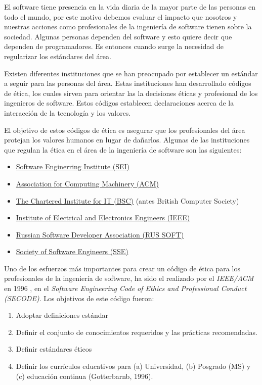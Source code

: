 \documentclass[twoside]{article}
\begin{document}
\begin{multicols}{2}
El software tiene presencia en la vida diaria de la mayor parte de las personas
en todo el mundo, por este motivo debemos evaluar el impacto que nosotros y
nuestras acciones como profesionales de la ingeniería de software tienen sobre
la sociedad. Algunas personas dependen del software y esto quiere decir que
dependen de programadores. Es entonces cuando surge la necesidad de regularizar
los estándares del área.

Existen diferentes instituciones que se han preocupado por establecer un
estándar a seguir para las personas del área. Estas instituciones han
desarrollado códigos de ética, los cuales sirven para orientar las la decisiones
éticas y profesional de los ingenieros de software. Estos códigos establecen
declaraciones acerca de la interacción de la tecnología y los valores.

El objetivo de estos códigos de ética es asegurar que los profesionales del área
protejan los valores humanos en lugar de dañarlos. Algunas de las instituciones
que regulan la ética en el área de la ingeniería de software son las siguientes:

\begin{itemize}
    \item \href{https://www.sei.cmu.edu/}{Software Enginerring Institute (SEI)}
    \item \href{https://www.acm.org/}{Association for Computing Machinery (ACM)}
\item \href{https://www.bcs.org/}{The Chartered Institute for IT (BSC)} (antes
British Computer Society)
\item \href{https://www.ieee.org/}{Institute of Electrical and Electronics
Engineers (IEEE)} \cite{rogerson2002software}
    \item \href{https://russoft.org/}{Russian Software Developer Association (RUS SOFT)}
    \item \href{https://sse.rit.edu/}{Society of Software Engineers (SSE)}
\end{itemize}

Uno de los esfuerzos más importantes para crear un código de ética para los
profesionales de la ingeniería de software, ha sido el realizado por el
\textit{IEEE/ACM} en 1996 \cite{gotterbarn2001software}, en el \textit{Software
Engineering Code of Ethics and Professional Conduct (SECODE)}. Los objetivos de este
código fueron:

\begin{enumerate}
    \item Adoptar definiciones estándar
    \item Definir el conjunto de conocimientos requeridos y las prácticas recomendadas.
    \item Definir estándares éticos
    \item Definir los currículos educativos para (a) Universidad, (b) Posgrado (MS) y (c)
educación continua (Gotterbarnb, 1996).
\end{enumerate}


\end{multicols}
\end{document}
